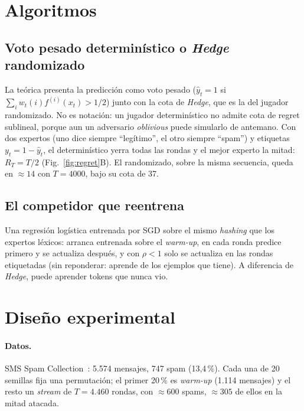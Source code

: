 \documentclass[10pt,twocolumn,a4paper]{article}
\begin{document}
\section{Algoritmos}

\subsection{Voto pesado determinístico o \emph{Hedge} randomizado}\label{sec:det}

La teórica presenta la predicción como voto pesado ($\hat y_t = 1$ si
$\sum_i w_t(i) f^{(i)}(x_t) > 1/2$) junto con la cota de \emph{Hedge}, que es la del jugador
randomizado. No es notación: un jugador determinístico no admite cota de regret sublineal, porque
aun un adversario \emph{oblivious} puede simularlo de antemano. Con dos expertos (uno dice siempre
``legítimo'', el otro siempre ``spam'') y etiquetas $y_t = 1 - \hat y_t$, el determinístico yerra
todas las rondas y el mejor experto la mitad: $R_T = T/2$ (Fig.~\ref{fig:regret}B). El randomizado,
sobre la misma secuencia, queda en $\approx 14$ con $T = 4000$, bajo su cota de 37.

\subsection{El competidor que reentrena}

Una regresión logística entrenada por SGD sobre el mismo \emph{hashing} que los expertos léxicos:
arranca entrenada sobre el \emph{warm-up}, en cada ronda predice primero y se actualiza después, y
con $\rho < 1$ solo se actualiza en las rondas etiquetadas (sin reponderar: aprende de los ejemplos
que tiene). A diferencia de \emph{Hedge}, puede aprender tokens que nunca vio.

\section{Diseño experimental}

\paragraph{Datos.} SMS Spam Collection~\cite{almeida2011contributions}: 5.574 mensajes, 747 spam
(13,4\,\%). Cada una de 20 semillas fija una permutación; el primer 20\,\% es \emph{warm-up} (1.114
mensajes) y el resto un \emph{stream} de $T = 4.460$ rondas, con $\approx 600$ spams, $\approx 305$
de ellos en la mitad atacada.
\end{document}
